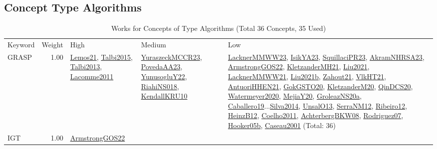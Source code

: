 \clearpage
\subsection{Concept Type Algorithms}
\label{sec:Algorithms}
\label{Algorithms}
{\scriptsize
\begin{longtable}{p{3cm}r>{\raggedright\arraybackslash}p{6cm}>{\raggedright\arraybackslash}p{6cm}>{\raggedright\arraybackslash}p{8cm}}
\rowcolor{white}\caption{Works for Concepts of Type Algorithms (Total 36 Concepts, 35 Used)}\\ \toprule
\rowcolor{white}Keyword & Weight & High & Medium & Low\\ \midrule\endhead
\bottomrule
\endfoot
\index{GRASP}\index{Algorithms!GRASP}GRASP &  1.00 & \hyperref[detail:Lemos21]{Lemos21}, \hyperref[detail:Talbi2015]{Talbi2015}, \hyperref[detail:Talbi2013]{Talbi2013}, \hyperref[detail:Lacomme2011]{Lacomme2011} & \hyperref[detail:YuraszeckMCCR23]{YuraszeckMCCR23}, \hyperref[detail:PovedaAA23]{PovedaAA23}, \hyperref[detail:YunusogluY22]{YunusogluY22}, \hyperref[detail:RiahiNS018]{RiahiNS018}, \hyperref[detail:KendallKRU10]{KendallKRU10} & \hyperref[detail:LacknerMMWW23]{LacknerMMWW23}, \hyperref[detail:IsikYA23]{IsikYA23}, \hyperref[detail:SquillaciPR23]{SquillaciPR23}, \hyperref[detail:AkramNHRSA23]{AkramNHRSA23}, \hyperref[detail:ArmstrongGOS22]{ArmstrongGOS22}, \hyperref[detail:KletzanderMH21]{KletzanderMH21}, \hyperref[detail:Liu2021]{Liu2021}, \hyperref[detail:LacknerMMWW21]{LacknerMMWW21}, \hyperref[detail:Liu2021b]{Liu2021b}, \hyperref[detail:Zahout21]{Zahout21}, \hyperref[detail:VlkHT21]{VlkHT21}, \hyperref[detail:AntuoriHHEN21]{AntuoriHHEN21}, \hyperref[detail:GokGSTO20]{GokGSTO20}, \hyperref[detail:KletzanderM20]{KletzanderM20}, \hyperref[detail:QinDCS20]{QinDCS20}, \hyperref[detail:Watermeyer2020]{Watermeyer2020}, \hyperref[detail:MejiaY20]{MejiaY20}, \hyperref[detail:GroleazNS20a]{GroleazNS20a}, \hyperref[detail:Caballero19]{Caballero19}...\hyperref[detail:Silva2014]{Silva2014}, \hyperref[detail:UnsalO13]{UnsalO13}, \hyperref[detail:SerraNM12]{SerraNM12}, \hyperref[detail:Ribeiro12]{Ribeiro12}, \hyperref[detail:HeinzB12]{HeinzB12}, \hyperref[detail:Coelho2011]{Coelho2011}, \hyperref[detail:AchterbergBKW08]{AchterbergBKW08}, \hyperref[detail:Rodriguez07]{Rodriguez07}, \hyperref[detail:Hooker05b]{Hooker05b}, \hyperref[detail:Caseau2001]{Caseau2001} (Total: 36)\\
\index{IGT}\index{Algorithms!IGT}IGT &  1.00 & \hyperref[detail:ArmstrongGOS22]{ArmstrongGOS22} &  & \\

\end{longtable}}
